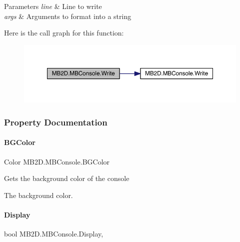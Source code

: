 \begin{DoxyParams}{Parameters}
{\em line} & Line to write\\
\hline
{\em args} & Arguments to format into a string\\
\hline
\end{DoxyParams}
Here is the call graph for this function\+:
\nopagebreak
\begin{figure}[H]
\begin{center}
\leavevmode
\includegraphics[width=350pt]{class_m_b2_d_1_1_m_b_console_ad7f7617e28472374b97fee653bd786be_cgraph}
\end{center}
\end{figure}


\subsubsection{Property Documentation}
\hypertarget{class_m_b2_d_1_1_m_b_console_a03439bac4bc6f5c737d221b3a093792d}{}\label{class_m_b2_d_1_1_m_b_console_a03439bac4bc6f5c737d221b3a093792d} 
\paragraph{\texorpdfstring{B\+G\+Color}{BGColor}}
{\footnotesize\ttfamily Color M\+B2\+D.\+M\+B\+Console.\+B\+G\+Color\hspace{0.3cm}{\ttfamily [get]}}



Gets the background color of the console 

The background color.\hypertarget{class_m_b2_d_1_1_m_b_console_a44be86cd008f735652365afccc777ad1}{}\label{class_m_b2_d_1_1_m_b_console_a44be86cd008f735652365afccc777ad1} 
\paragraph{\texorpdfstring{Display}{Display}}
{\footnotesize\ttfamily bool M\+B2\+D.\+M\+B\+Console.\+Display\hspace{0.3cm}{\ttfamily [get]}, {\ttfamily [set]}}



